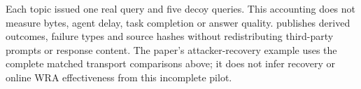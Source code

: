 Each topic issued one real query and five decoy queries. This accounting does not measure bytes, agent delay, task completion or answer quality.  publishes derived outcomes, failure types and source hashes without redistributing third-party prompts or response content. The paper's attacker-recovery example uses the complete matched transport comparisons above; it does not infer recovery or online WRA effectiveness from this incomplete pilot.
